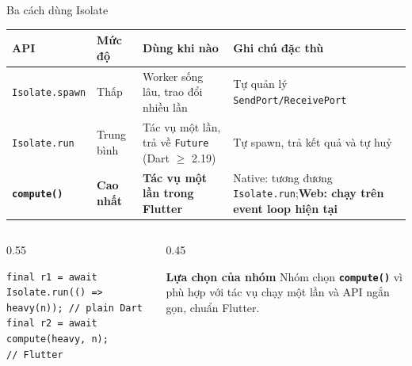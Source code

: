 \documentclass[aspectratio=169,11pt]{beamer}
\begin{document}
\begin{frame}[fragile]{Ba cách dùng Isolate}
  \begin{table}
    \scriptsize
    \centering
    \begin{tabular}{p{2.3cm} p{1.3cm} >{\raggedright\arraybackslash}p{3.8cm} >{\raggedright\arraybackslash}p{4.6cm}}
      \toprule
      \rowcolor{purpL}
      \textbf{API} & \textbf{Mức độ} & \textbf{Dùng khi nào} & \textbf{Ghi chú đặc thù} \\
      \midrule
      \texttt{Isolate.spawn} & Thấp & Worker sống lâu, trao đổi nhiều lần & Tự quản lý \texttt{SendPort/ReceivePort} \\
      \texttt{Isolate.run} & Trung bình & Tác vụ một lần, trả về \texttt{Future} (Dart $\ge$ 2.19) & Tự spawn, trả kết quả và tự huỷ \\
      \textbf{\texttt{compute()}} & \textbf{Cao nhất} & \textbf{Tác vụ một lần trong Flutter} & Native: tương đương \texttt{Isolate.run};\newline \textbf{Web: chạy trên event loop hiện tại} \\
      \bottomrule
    \end{tabular}
  \end{table}

  \vspace{0.1cm}
  \begin{columns}[T]
    \begin{column}{0.55\textwidth}
\begin{lstlisting}
final r1 = await Isolate.run(() => heavy(n)); // plain Dart
final r2 = await compute(heavy, n);           // Flutter
\end{lstlisting}
    \end{column}
    \begin{column}{0.45\textwidth}
      \begin{block}{\scriptsize\bfseries Lựa chọn của nhóm}
        \scriptsize Nhóm chọn \textbf{\texttt{compute()}} vì phù hợp với tác vụ chạy một lần và API ngắn gọn, chuẩn Flutter.
      \end{block}
    \end{column}
  \end{columns}
\end{frame}
\end{document}

